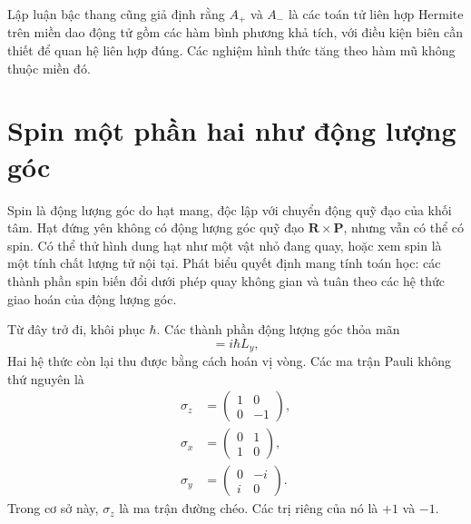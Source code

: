 \begin{classroomqa}
\end{classroomqa}

Lập luận bậc thang cũng giả định rằng \(A_{+}\) và \(A_{-}\) là các toán tử liên hợp Hermite trên miền dao động tử gồm các hàm bình phương khả tích, với điều kiện biên cần thiết để quan hệ liên hợp đúng. Các nghiệm hình thức tăng theo hàm mũ không thuộc miền đó.

\begin{classroomqa}
\end{classroomqa}

\section{Spin một phần hai như động lượng góc}

Spin là động lượng góc do hạt mang, độc lập với chuyển động quỹ đạo của khối tâm. Hạt đứng yên không có động lượng góc quỹ đạo \(\mathbf R\times\mathbf P\), nhưng vẫn có thể có spin. Có thể thử hình dung hạt như một vật nhỏ đang quay, hoặc xem spin là một tính chất lượng tử nội tại. Phát biểu quyết định mang tính toán học: các thành phần spin biến đổi dưới phép quay không gian và tuân theo các hệ thức giao hoán của động lượng góc.

Từ đây trở đi, khôi phục \(\hbar\). Các thành phần động lượng góc thỏa mãn
\begin{equation}
[L_{z},L_{x}]=i\hbar L_{y},
\end{equation}
Hai hệ thức còn lại thu được bằng cách hoán vị vòng. Các ma trận Pauli không thứ nguyên là
\begin{equation}
\begin{aligned}
\sigma_{z}&=
\begin{pmatrix}
1&0\\
0&-1
\end{pmatrix},\\[0.4em]
\sigma_{x}&=
\begin{pmatrix}
0&1\\
1&0
\end{pmatrix},\\[0.4em]
\sigma_{y}&=
\begin{pmatrix}
0&-i\\
i&0
\end{pmatrix}.
\end{aligned}
\end{equation}
Trong cơ sở này, \(\sigma_{z}\) là ma trận đường chéo. Các trị riêng của nó là \(+1\) và
\(-1\).

